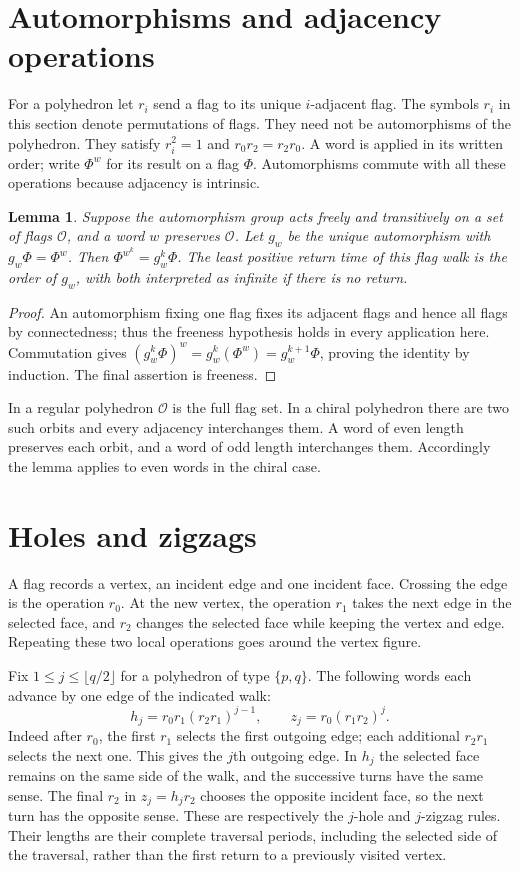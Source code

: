 \documentclass[11pt,a4paper]{article}
\newtheorem{lemma}[proposition]{Lemma}
\begin{document}
\section{Automorphisms and adjacency operations}
For a polyhedron let $r_i$ send a flag to its unique $i$-adjacent flag.
The symbols $r_i$ in this section denote permutations of flags. They
need not be automorphisms of the polyhedron. They satisfy $r_i^2=1$
and $r_0r_2=r_2r_0$. A word is applied in its written order; write
$\Phi^w$ for its result on a flag $\Phi$. Automorphisms commute with
all these operations because adjacency is intrinsic.

\begin{lemma}\label{period}
Suppose the automorphism group acts freely and transitively on a set
of flags $\mathcal O$, and a word $w$ preserves $\mathcal O$.
Let $g_w$ be the unique automorphism with $g_w\Phi=\Phi^w$.
Then $\Phi^{w^k}=g_w^k\Phi$. The least positive return time of this
flag walk is the order of $g_w$, with both interpreted as infinite
if there is no return.
\end{lemma}
\begin{proof}
An automorphism fixing one flag fixes its adjacent flags and hence all
flags by connectedness; thus the freeness hypothesis holds in every
application here. Commutation gives
$(g_w^k\Phi)^w=g_w^k(\Phi^w)=g_w^{k+1}\Phi$, proving the identity by
induction. The final assertion is freeness.
\end{proof}
In a regular polyhedron $\mathcal O$ is the full flag set. In a chiral
polyhedron there are two such orbits and every adjacency interchanges
them. A word of even length preserves each orbit, and a word of odd
length interchanges them. Accordingly the lemma applies to even words
in the chiral case.

\section{Holes and zigzags}
A flag records a vertex, an incident edge and one incident face.
Crossing the edge is the operation $r_0$. At the new vertex, the
operation $r_1$ takes the next edge in the selected face, and $r_2$
changes the selected face while keeping the vertex and edge. Repeating
these two local operations goes around the vertex figure.

Fix $1\leq j\leq\lfloor q/2\rfloor$ for a polyhedron of type $\{p,q\}$.
The following words each advance by one edge of the indicated walk:
\[
 h_j=r_0r_1(r_2r_1)^{j-1},\qquad
 z_j=r_0(r_1r_2)^j.
\]
Indeed after $r_0$, the first $r_1$ selects the first outgoing edge;
each additional $r_2r_1$ selects the next one. This gives the $j$th
outgoing edge. In $h_j$ the selected face remains on the same side of
the walk, and the successive turns have the same sense. The final
$r_2$ in $z_j=h_jr_2$ chooses the opposite incident face, so the next
turn has the opposite sense. These are respectively the $j$-hole and
$j$-zigzag rules. Their lengths are their complete traversal periods,
including the selected side of the traversal, rather than the first
return to a previously visited vertex.
\end{document}

